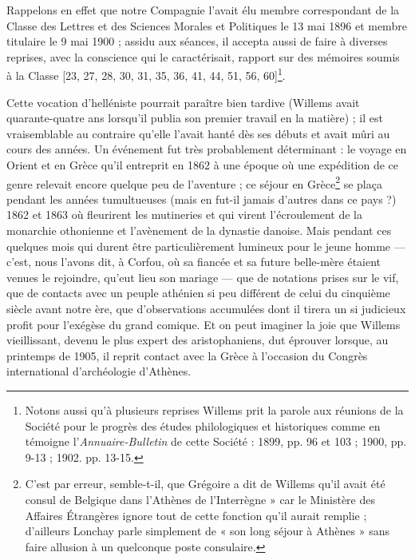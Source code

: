 \documentclass{book}%
\newcommand{\italique}[1]{\textit{#1}}%
\newcommand{\note}[1]{\footnote{#1}}
\begin{document}
Rappelons en effet que notre Compagnie l'avait élu membre correspondant de la Classe des Lettres et des Sciences Morales et Politiques le 13 mai 1896 et membre titulaire le 9 mai 1900 ; assidu aux séances, il accepta aussi de faire à diverses reprises, avec la conscience qui le caractérisait, rapport sur des mémoires soumis à la Classe [23, 27, 28, 30, 31, 35, 36, 41, 44, 51, 56, 60]\note{Notons aussi qu'à plusieurs reprises Willems prit la parole aux réunions de la Société pour le progrès des études philologiques et historiques comme en témoigne l'\italique{Annuaire-Bulletin} de cette Société : 1899, pp. 96 et 103 ; 1900, pp. 9-13 ; 1902. pp. 13-15.}. 

Cette vocation d'helléniste pourrait paraître bien tardive (Willems avait quarante-quatre ans lorsqu'il publia son premier travail en la matière) ; il est vraisemblable au contraire qu'elle l'avait hanté dès ses débuts et avait mûri au cours des années.
Un événement fut très probablement déterminant : le voyage en Orient et en Grèce qu'il entreprit en 1862 à une époque où une expédition de ce genre relevait encore quelque peu de l'aventure ; ce séjour en Grèce\note{C'est par erreur, semble-t-il, que Grégoire a dit de Willems qu'il avait été consul de Belgique dans l'Athènes de l'Interrègne » car le Ministère des Affaires Étrangères ignore tout de cette fonction qu'il aurait remplie ; d'ailleurs Lonchay parle simplement de « son long séjour à Athènes » sans faire allusion à un quelconque poste consulaire.} se plaça pendant les années tumultueuses (mais en fut-il jamais d'autres dans ce pays ?) 1862 et 1863 où fleurirent les mutineries et qui virent l'écroulement de la monarchie othonienne et l'avènement de la dynastie danoise.
Mais pendant ces quelques mois qui durent être particulièrement lumineux pour le jeune homme — c'est, nous l'avons dit, à Corfou, où sa fiancée et sa future belle-mère étaient venues le rejoindre, qu'eut lieu son mariage — que de notations prises sur le vif, que de contacts avec un peuple athénien si peu différent de celui du cinquième siècle avant notre ère, que d'observations accumulées dont il tirera un si judicieux profit pour l'exégèse du grand comique. 
Et on peut imaginer la joie que Willems vieillissant, devenu le plus expert des aristophaniens, dut éprouver lorsque, au printemps de 1905, il reprit contact avec la Grèce à l'occasion du Congrès international d'archéologie d'Athènes. 
\end{document}
